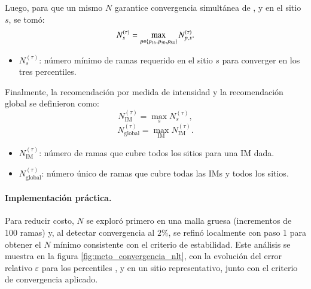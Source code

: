 Luego, para que un mismo $N$ garantice convergencia simultánea de \pSixteen{}, \pFifty{} y \pEightyFour{} en el sitio $s$, se tomó:
\begin{equation}
N^{(\tau)}_{s}=\max_{p\in\{p_{16}{},p_{50}{},p_{84}{}\}} N^{(\tau)}_{p,s}.
\end{equation}
\begin{itemize}
  \item $N^{(\tau)}_{s}$: número mínimo de ramas requerido en el sitio $s$ para converger en los tres percentiles.
\end{itemize}

Finalmente, la recomendación por medida de intensidad y la recomendación global se definieron como:
\begin{equation}
N^{(\tau)}_{\mathrm{IM}}=\max_{s} N^{(\tau)}_{s},
\end{equation}
\begin{equation}
N^{(\tau)}_{\mathrm{global}}=\max_{\mathrm{IM}} N^{(\tau)}_{\mathrm{IM}}.
\end{equation}
\begin{itemize}
  \item $N^{(\tau)}_{\mathrm{IM}}$: número de ramas que cubre todos los sitios para una IM dada.
  \item $N^{(\tau)}_{\mathrm{global}}$: número único de ramas que cubre todas las IMs y todos los sitios.
\end{itemize}

\paragraph{Implementación práctica.}
Para reducir costo, $N$ se exploró primero en una malla gruesa (incrementos de 100 ramas) y, al detectar convergencia al $2\%$, se refinó localmente con paso 1 para obtener el $N$ mínimo consistente con el criterio de estabilidad. Este análisis se muestra en la figura \ref{fig:meto_convergencia_nlt}, con la evolución del error relativo $\varepsilon$ para los percentiles \pSixteen{}, \pFifty{} y \pEightyFour{} en un sitio representativo, junto con el criterio de convergencia aplicado.

